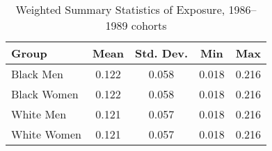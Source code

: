 \begin{table}[ht]
\caption{Weighted Summary Statistics of Exposure, 1986--1989 cohorts}
\label{tab:sumStatsPost}
\centering
\begin{threeparttable}
\begin{tabular}{lcccc}
\toprule 
Group & Mean & Std. Dev. & Min & Max \\
\midrule 
Black Men     & 0.122 & 0.058 & 0.018 & 0.216 \\ 
Black Women   & 0.122 & 0.058 & 0.018 & 0.216 \\ 
White Men     & 0.121 & 0.057 & 0.018 & 0.216 \\ 
White Women   & 0.121 & 0.057 & 0.018 & 0.216 \\ 
\bottomrule 
\end{tabular} 
\end{threeparttable} 
\end{table} 
